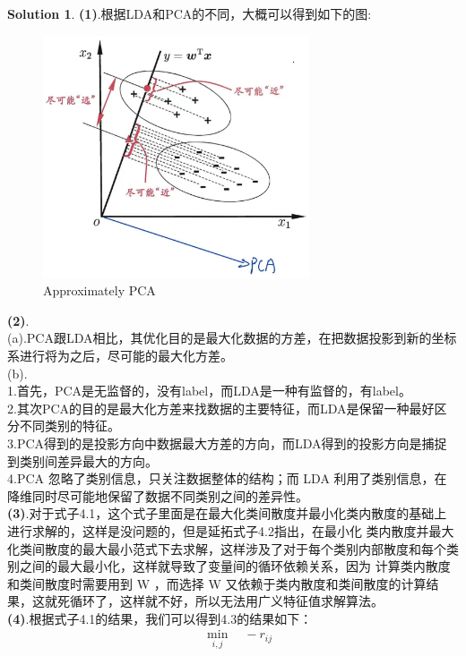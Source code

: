 \documentclass[a4paper]{article}
\numberwithin{equation}{section}
\theoremstyle{definition}
\newtheorem*{solution}{Solution}
\begin{document}
\begin{solution}
	\textbf{(1)}.根据LDA和PCA的不同，大概可以得到如下的图:
	\begin{figure}[H]
		\centering
		\includegraphics[width=0.7\textwidth]{1.png}
		\caption{Approximately PCA}
		\label{fig:roc1}
	\end{figure}
	\textbf{(2)}.\\
	(a).PCA跟LDA相比，其优化目的是最大化数据的方差，在把数据投影到新的坐标系进行将为之后，尽可能的最大化方差。\\
	(b).\\
	1.首先，PCA是无监督的，没有label，而LDA是一种有监督的，有label。\\
	2.其次PCA的目的是最大化方差来找数据的主要特征，而LDA是保留一种最好区分不同类别的特征。\\
	3.PCA得到的是投影方向中数据最大方差的方向，而LDA得到的投影方向是捕捉到类别间差异最大的方向。\\
	4.PCA 忽略了类别信息，只关注数据整体的结构；而 LDA 利用了类别信息，在降维同时尽可能地保留了数据不同类别之间的差异性。\\
	\textbf{(3)}.对于式子4.1，这个式子里面是在最大化类间散度并最小化类内散度的基础上进行求解的，这样是没问题的，但是延拓式子4.2指出，在最小化
	类内散度并最大化类间散度的最大最小范式下去求解，这样涉及了对于每个类别内部散度和每个类别之间的最大最小化，这样就导致了变量间的循环依赖关系，因为
	计算类内散度和类间散度时需要用到 W ，而选择 W 又依赖于类内散度和类间散度的计算结果，这就死循环了，这样就不好，所以无法用广义特征值求解算法。\\
	\textbf{(4)}.根据式子4.1的结果，我们可以得到4.3的结果如下：
	\begin{equation}
		\begin{aligned}
		& \min_{i,j} \quad -r_{ij}\\                                            

\end{aligned}
\end{equation}
\end{solution}
\end{document}
